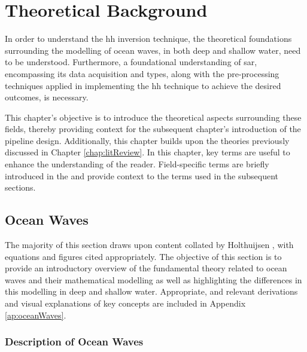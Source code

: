 \chapter{Theoretical Background}
\label{chap:theory}
In order to understand the \ac{hh} inversion technique, the theoretical foundations surrounding the modelling of ocean waves, in both deep and shallow water, need to be understood. Furthermore, a foundational understanding of \ac{sar}, encompassing its data acquisition and types, along with the pre-processing techniques applied in implementing the \ac{hh} technique to achieve the desired outcomes, is necessary.

This chapter's objective is to introduce the theoretical aspects surrounding these fields, thereby providing context for the subsequent chapter's introduction of the pipeline design. Additionally, this chapter builds upon the theories previously discussed in Chapter \ref{chap:litReview}. In this chapter, key terms are useful to enhance the understanding of the reader. Field-specific terms are briefly introduced in the  and provide context to the terms used in the subsequent sections.

\section{Ocean Waves} \label{sec:theory.waves}
The majority of this section draws upon content collated by Holthuijsen \cite{Holthuijsen2007}, with equations and figures cited appropriately. The objective of this section is to provide an introductory overview of the fundamental theory related to ocean waves and their mathematical modelling as well as highlighting the differences in this modelling in deep and shallow water. Appropriate, and relevant derivations and visual explanations of key concepts are included in Appendix \ref{ap:oceanWaves}. %

\subsection{Description of Ocean Waves} \label{subsec:theory.waves.description}

